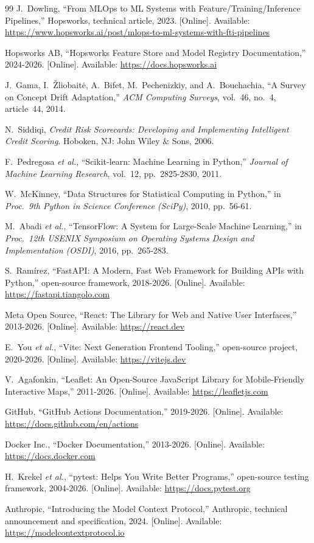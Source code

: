 \begin{thebibliography}{99}
 J.~Dowling, ``From MLOps to ML Systems with
Feature/Training/Inference Pipelines,'' Hopsworks, technical article, 2023.
[Online]. Available: \url{https://www.hopsworks.ai/post/mlops-to-ml-systems-with-fti-pipelines}

 Hopsworks AB, ``Hopsworks Feature Store and Model
Registry Documentation,'' 2024-2026. [Online]. Available:
\url{https://docs.hopsworks.ai}

 J.~Gama, I.~Žliobaitė, A.~Bifet, M.~Pechenizkiy, and
A.~Bouchachia, ``A Survey on Concept Drift Adaptation,'' \emph{ACM Computing
Surveys}, vol.~46, no.~4, article~44, 2014.

 N.~Siddiqi, \emph{Credit Risk Scorecards: Developing and
Implementing Intelligent Credit Scoring}. Hoboken, NJ: John Wiley \& Sons, 2006.

 F.~Pedregosa \emph{et al.}, ``Scikit-learn: Machine
Learning in Python,'' \emph{Journal of Machine Learning Research}, vol.~12,
pp.~2825-2830, 2011.

 W.~McKinney, ``Data Structures for Statistical Computing in
Python,'' in \emph{Proc.\ 9th Python in Science Conference (SciPy)}, 2010,
pp.~56-61.

 M.~Abadi \emph{et al.}, ``TensorFlow: A System for
Large-Scale Machine Learning,'' in \emph{Proc.\ 12th USENIX Symposium on
Operating Systems Design and Implementation (OSDI)}, 2016, pp.~265-283.

 S.~Ramírez, ``FastAPI: A Modern, Fast Web Framework for
Building APIs with Python,'' open-source framework, 2018-2026. [Online].
Available: \url{https://fastapi.tiangolo.com}

 Meta Open Source, ``React: The Library for Web and Native
User Interfaces,'' 2013-2026. [Online]. Available: \url{https://react.dev}

 E.~You \emph{et al.}, ``Vite: Next Generation Frontend
Tooling,'' open-source project, 2020-2026. [Online]. Available:
\url{https://vitejs.dev}

 V.~Agafonkin, ``Leaflet: An Open-Source JavaScript Library
for Mobile-Friendly Interactive Maps,'' 2011-2026. [Online]. Available:
\url{https://leafletjs.com}

 GitHub, ``GitHub Actions Documentation,'' 2019-2026.
[Online]. Available: \url{https://docs.github.com/en/actions}

 Docker Inc., ``Docker Documentation,'' 2013-2026.
[Online]. Available: \url{https://docs.docker.com}

 H.~Krekel \emph{et al.}, ``pytest: Helps You Write Better
Programs,'' open-source testing framework, 2004-2026. [Online]. Available:
\url{https://docs.pytest.org}

 Anthropic, ``Introducing the Model Context Protocol,'' Anthropic,
technical announcement and specification, 2024. [Online]. Available:
\url{https://modelcontextprotocol.io}

\end{thebibliography}
